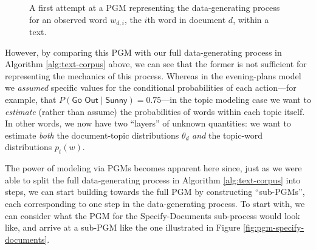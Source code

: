 \documentclass[11pt]{article}
\begin{document}

\begin{figure}[ht!]
	\centering
	\caption{A first attempt at a PGM representing the data-generating process for an observed word $w_{d,i}$, the $i$th word in document $d$, within a text.}
	\label{fig:pgm-word-simple}
\end{figure}

However, by comparing this PGM with our full data-generating process in Algorithm \ref{alg:text-corpus} above, we can see that the former is not sufficient for representing the mechanics of this process. Whereas in the evening-plans model we \textit{assumed} specific values for the conditional probabilities of each action---for example, that $P(\textsf{Go Out} \; | \; \textsf{Sunny}) = 0.75$---in the topic modeling case we want to \textit{estimate} (rather than assume) the probabilities of words within each topic itself. In other words, we now have two ``layers'' of unknown quantities: we want to estimate \textit{both} the document-topic distributions $\theta_d$ \textit{and} the topic-word distributions $p_t(w)$.

The power of modeling via PGMs becomes apparent here since, just as we were able to split the full data-generating process in Algorithm \ref{alg:text-corpus} into steps, we can start building towards the full PGM by constructing ``sub-PGMs'', each corresponding to one step in the data-generating process.
To start with, we can consider what the PGM for the \textsf{Specify-Documents} sub-process would look like, and arrive at a sub-PGM like the one illustrated in Figure \ref{fig:pgm-specify-documents}.
\end{document}
